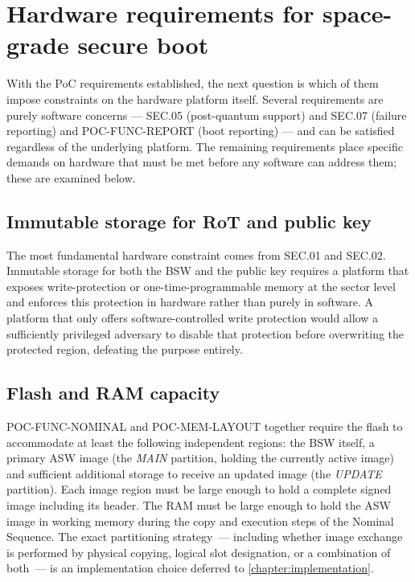 \section{Hardware requirements for space-grade secure boot}
\label{section:hw-reqs}

With the PoC requirements established, the next question is which of them impose constraints on the hardware platform itself. Several requirements are purely software concerns — SEC.05 (post-quantum support) and SEC.07 (failure reporting) and POC-FUNC-REPORT (boot reporting) — and can be satisfied regardless of the underlying platform. The remaining requirements place specific demands on hardware that must be met before any software can address them; these are examined below.

\subsection{Immutable storage for RoT and public key}

The most fundamental hardware constraint comes from SEC.01 and SEC.02. Immutable storage for both the BSW and the public key requires a platform that exposes write-protection or one-time-programmable memory at the sector level and enforces this protection in hardware rather than purely in software. A platform that only offers software-controlled write protection would allow a sufficiently privileged adversary to disable that protection before overwriting the protected region, defeating the purpose entirely.

\subsection{Flash and RAM capacity}

POC-FUNC-NOMINAL and POC-MEM-LAYOUT together require the flash to accommodate at least the following independent regions: the BSW itself, a primary ASW image (the \emph{MAIN} partition, holding the currently active image) and sufficient additional storage to receive an updated image (the \emph{UPDATE} partition). Each image region must be large enough to hold a complete signed image including its header. The RAM must be large enough to hold the ASW image in working memory during the copy and execution steps of the Nominal Sequence. The exact partitioning strategy~--- including whether image exchange is performed by physical copying, logical slot designation, or a combination of both~--- is an implementation choice deferred to \autoref{chapter:implementation}.

